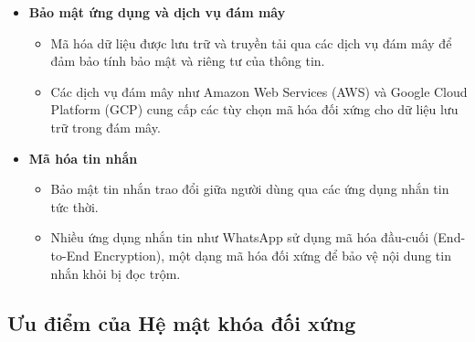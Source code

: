 \begin{itemize}
    \item \textbf{Bảo mật ứng dụng và dịch vụ đám mây}
    \begin{itemize}
        \item  Mã hóa dữ liệu được lưu trữ và truyền tải qua các dịch vụ đám mây để đảm bảo tính bảo mật và riêng tư của thông tin.
        \item  Các dịch vụ đám mây như Amazon Web Services (AWS) và Google Cloud Platform (GCP) cung cấp các tùy chọn mã hóa đối xứng cho dữ liệu lưu trữ trong đám mây.
    \end{itemize}

    \item \textbf{Mã hóa tin nhắn}
    \begin{itemize}
        \item  Bảo mật tin nhắn trao đổi giữa người dùng qua các ứng dụng nhắn tin tức thời.
        \item  Nhiều ứng dụng nhắn tin như WhatsApp sử dụng mã hóa đầu-cuối (End-to-End Encryption), một dạng mã hóa đối xứng để bảo vệ nội dung tin nhắn khỏi bị đọc trộm.
    \end{itemize}
\end{itemize}
\subsection{Ưu điểm của Hệ mật khóa đối xứng}

